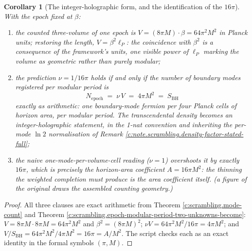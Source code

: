 \documentclass[11pt]{article}
\newtheorem{corollary}[theorem]{Corollary}
\theoremstyle{definition}
\theoremstyle{plain}
\providecommand{\SBH}{}\renewcommand{\SBH}{S_{\mathrm{BH}}}
\providecommand{\lP}{}\renewcommand{\lP}{\ell_{P}}
\begin{document}
\begin{corollary}[The integer-holographic form, and the identification of the $16\pi$]\label{c:scrambling.integer-holographic-form-identification}
With the epoch fixed at $\beta$:
\begin{enumerate}
\item the counted three-volume of one epoch is $V = (8\pi M)\cdot\beta = 64\pi^2M^2$ in Planck units; restoring the length, $V = \beta^2\lP$: the coincidence with $\beta^2$ is a consequence of the framework's units, one visible power of $\lP$ marking the volume as geometric rather than purely modular;
\item the prediction $\nu = 1/16\pi$ holds if and only if the number of boundary modes registered per modular period is
\[
N_{\mathrm{epoch}} \;=\; \nu\,V \;=\; 4\pi M^2 \;=\; \SBH
\]
exactly as arithmetic: \emph{one boundary-mode fermion per four Planck cells of horizon area, per modular period}. The transcendental density becomes an integer-holographic statement, in the 1-nat convention and inheriting the per-mode $\ln 2$ normalisation of Remark \ref{c:note.scrambling.density-factor-stated-full};
\item the naive one-mode-per-volume-cell reading ($\nu = 1$) overshoots it by exactly $16\pi$, which is precisely the horizon-area coefficient $A = 16\pi M^2$: the thinning the weighted completion must produce is the area coefficient itself. (a figure of the original draws the assembled counting geometry.)
\end{enumerate}
\end{corollary}
\begin{proof}
All three clauses are exact arithmetic from Theorem \ref{c:scrambling.mode-count} and Theorem \ref{c:scrambling.epoch-modular-period-two-unknowns-become}: $V = 8\pi M \cdot 8\pi M = 64\pi^2 M^2$ and $\beta^2 = (8\pi M)^2$; $\nu V = 64\pi^2M^2/16\pi = 4\pi M^2$; and $V/\SBH = 64\pi^2M^2/4\pi M^2 = 16\pi = A/M^2$. The script checks each as an exact identity in the formal symbols $(\pi, M)$.

\end{proof}
\end{document}
